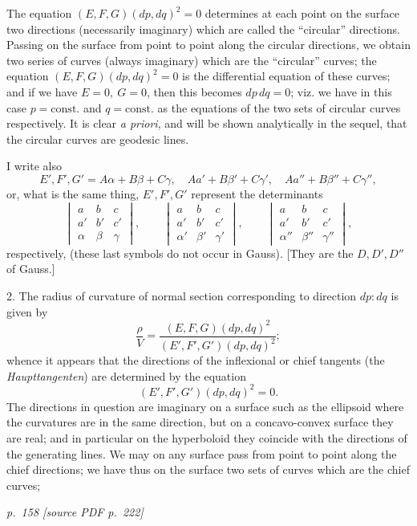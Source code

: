 \documentclass[11pt,a4paper]{article}
\newcommand{\sourcepage}[2]{%
  \bigskip
  \noindent\textit{p.~#1 [source PDF p.~#2]}%
  \par\smallskip
}
\newcommand{\qform}[2]{(#1)(#2)^2}
\begin{document}
The equation \(\qform{E,F,G}{dp,dq}=0\) determines at each point on the surface
two directions (necessarily imaginary) which are called the ``circular'' directions.
Passing on the surface from point to point along the circular directions, we obtain
two series of curves (always imaginary) which are the ``circular'' curves; the equation
\(\qform{E,F,G}{dp,dq}=0\) is the differential equation of these curves; and if we
have \(E=0,\ G=0\), then this becomes \(dp\,dq=0\); viz. we have in this case
\(p=\mathrm{const.}\) and \(q=\mathrm{const.}\) as the equations of the two sets of
circular curves respectively. It is clear \emph{a priori}, and will be shown analytically
in the sequel, that the circular curves are geodesic lines.

I write also
\[
E',F',G'=A\alpha+B\beta+C\gamma,\quad
Aa'+B\beta'+C\gamma',\quad
Aa''+B\beta''+C\gamma'',
\]
or, what is the same thing, \(E',F',G'\) represent the determinants
\[
\begin{vmatrix}a&b&c\\ a'&b'&c'\\ \alpha&\beta&\gamma\end{vmatrix},\qquad
\begin{vmatrix}a&b&c\\ a'&b'&c'\\ \alpha'&\beta'&\gamma'\end{vmatrix},\qquad
\begin{vmatrix}a&b&c\\ a'&b'&c'\\ \alpha''&\beta''&\gamma''\end{vmatrix},
\]
respectively, (these last symbols do not occur in Gauss). [They are the
\(D,D',D''\) of Gauss.]

2. The radius of curvature of normal section corresponding to direction \(dp:dq\) is
given by
\[
\frac{\rho}{V}=\frac{\qform{E,F,G}{dp,dq}}{\qform{E',F',G'}{dp,dq}};
\]
whence it appears that the directions of the inflexional or chief tangents (the
\emph{Haupttangenten}) are determined by the equation
\[
\qform{E',F',G'}{dp,dq}=0.
\]
The directions in question are imaginary on a surface such as the ellipsoid where
the curvatures are in the same direction, but on a concavo-convex surface they are
real; and in particular on the hyperboloid they coincide with the directions of the
generating lines. We may on any surface pass from point to point along the chief
directions; we have thus on the surface two sets of curves which are the chief curves;

\sourcepage{158}{222}
\end{document}
